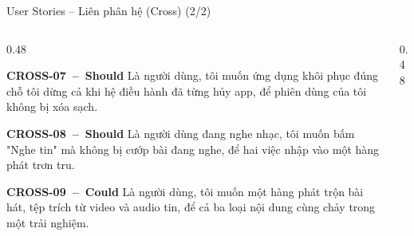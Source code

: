 \documentclass[aspectratio=169]{beamer}
\begin{document}
\begin{frame}{User Stories -- Liên phân hệ (Cross) (2/2)}
  \begin{columns}
    \begin{column}{0.48\textwidth}
      \begin{block}{\scriptsize\bfseries CROSS-07~--~Should}
        {\tiny Là người dùng, tôi muốn ứng dụng khôi phục đúng chỗ tôi dừng cả khi hệ điều hành đã từng hủy app, để phiên dùng của tôi không bị xóa sạch.}
      \end{block}
      \begin{block}{\scriptsize\bfseries CROSS-08~--~Should}
        {\tiny Là người dùng đang nghe nhạc, tôi muốn bấm "Nghe tin" mà không bị cướp bài đang nghe, để hai việc nhập vào một hàng phát trơn tru.}
      \end{block}
      \begin{block}{\scriptsize\bfseries CROSS-09~--~Could}
        {\tiny Là người dùng, tôi muốn một hàng phát trộn bài hát, tệp trích từ video và audio tin, để cả ba loại nội dung cùng chảy trong một trải nghiệm.}
      \end{block}
    \end{column}
    \begin{column}{0.48\textwidth}

    \end{column}
  \end{columns}
\end{frame}

\end{document}

